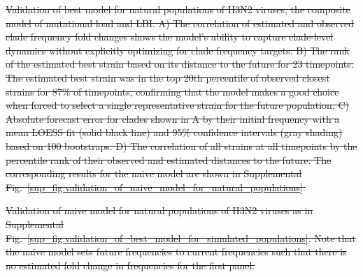 \documentclass[9pt,lineno]{elife} %
\providecommand{\DIFdel}[1]{{\protect\color{red}\sout{#1}}}                      %
\providecommand{\DIFdelFL}[1]{\DIFdel{#1}} %
\providecommand{\DIFdeltex}[1]{{\protect\color{red}\sout{#1}}}                      %
\providecommand{\DIFdelFL}[1]{\DIFdel{#1}} %
\providecommand{\DIFdel}[1]{\texorpdfstring{\DIFdeltex{#1}}{}} %
\begin{document}
{%
\DIFdelFL{Validation of best model for natural populations of H3N2 viruses, the composite model of mutational load and LBI.
  A) The correlation of estimated and observed clade frequency fold changes shows the model's ability to capture clade-level dynamics without explicitly optimizing for clade frequency targets.
  B) The rank of the estimated best strain based on its distance to the future for 23 timepoints.
  The estimated best strain was in the top 20th percentile of observed closest strains for 87\% of timepoints, confirming that the model makes a good choice when forced to select a single representative strain for the future population.
  C) Absolute forecast error for clades shown in A by their initial frequency with a mean LOESS fit (solid black line) and 95\% confidence intervals (gray shading) based on 100 bootstraps.
  D) The correlation of all strains at all timepoints by the percentile rank of their observed and estimated distances to the future.
  The corresponding results for the naive model are shown in Supplemental Fig.~\ref{sup_fig:validation_of_naive_model_for_natural_populations}.
  }}

{%
\DIFdelFL{Validation of naive model for natural populations of H3N2 viruses as in Supplemental Fig.~\ref{sup_fig:validation_of_best_model_for_simulated_populations}.
  Note that the naive model sets future frequencies to current frequencies such that there is no estimated fold change in frequencies for the first panel.
  }}
\end{document}
